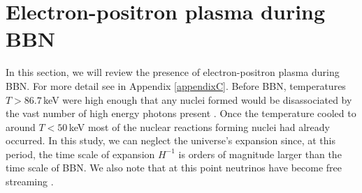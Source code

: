 

 


\section{Electron-positron plasma during BBN}\label{sec:density}
In this section, we will review the presence of electron-positron plasma during BBN. For more detail see \citep{Grayson:2023flr} in Appendix \ref{appendixC}. Before BBN, temperatures $T>86.7\,$keV were high enough that any nuclei formed would be disassociated by the vast number of high energy photons present \citep{Pitrou:2018cgg}. Once the temperature cooled to around $T<50\,$keV most of the nuclear reactions forming nuclei had already occurred. In this study, we can neglect the universe's expansion since, at this period, the time scale of expansion $H^{-1}$ is orders of magnitude larger than the time scale of BBN. We also note that at this point neutrinos have become free streaming \citep{Birrell:2012gg}.


